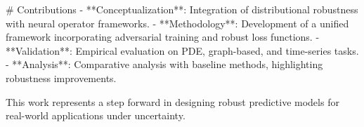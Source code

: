 # Contributions  
- **Conceptualization**: Integration of distributional robustness with neural operator frameworks.
- **Methodology**: Development of a unified framework incorporating adversarial training and robust loss functions.
- **Validation**: Empirical evaluation on PDE, graph-based, and time-series tasks.
- **Analysis**: Comparative analysis with baseline methods, highlighting robustness improvements.

This work represents a step forward in designing robust predictive models for real-world applications under uncertainty.